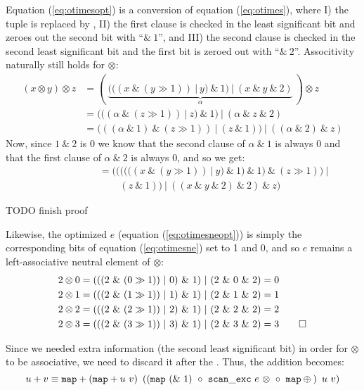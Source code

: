 Equation (\ref{eq:otimesopt}) is a conversion of equation (\ref{eq:otimes}), where I) the tuple is replaced by , II) the first clause is checked in the least significant bit and zeroes out the second bit with ``$\&~1$'', and III) the second clause is checked in the second least significant bit and the first bit is zeroed out with ``$\&~2$''. Associtivity naturally still holds for $\otimes$:
\begin{align}
  \label{eq:otimesproof}
  (x \otimes y) \otimes z &= (~\underbrace{(((x~\&~(y \gg 1))~|~y)~\&~1)~|~(x~\&~y~\&~2)}_{\alpha}~) \otimes z\\
              &= (((\alpha~\&~(z \gg 1))~|~z)~\&~1)~|~(\alpha~\&~z~\&~2)\\
              &= (((\alpha~\&~1)~\&~(z \gg 1))~|~(z~\&~1))~|~((\alpha~\&~2)~\&~z)
\end{align}
Now, since $1~\&~2$ is $0$ we know that the second clause of $\alpha~\&~1$ is always $0$ and that the first clause of $\alpha~\&~2$ is always $0$, and so we get: 
  \begin{align}
  \label{eq:otimesproof}
  \phantom{(x \otimes y) \otimes z}
    &= ((((((x~\&~(y \gg 1))~|~y)~\&~1)~\&~1)~\&~(z \gg 1))~|\\
    &\phantom{= ((}(z~\&~1))~|~((x~\&~y~\&~2)~\&~2)~\&~z)
  \end{align}
  
{\color{red} TODO finish proof}


Likewise, the optimized $e$ (equation (\ref{eq:otimesneopt})) is simply the corresponding bits of equation (\ref{eq:otimesne}) set to 1 and 0, and so $e$ remains a left-associative neutral element of $\otimes$:
\begin{align}
  \label{eq:otimesneproof}
  2 \otimes 0 &= (((2~\&~(0 \gg 1))~|~0)~\&~1)~|~(2~\&~0~\&~2) = 0 \\
  2 \otimes 1 &= (((2~\&~(1 \gg 1))~|~1)~\&~1)~|~(2~\&~1~\&~2) = 1 \\
  2 \otimes 2 &= (((2~\&~(2 \gg 1))~|~2)~\&~1)~|~(2~\&~2~\&~2) = 2 \\
  2 \otimes 3 &= (((2~\&~(3 \gg 1))~|~3)~\&~1)~|~(2~\&~3~\&~2) = 3 \qed
\end{align}

Since we needed extra information (the second least significant bit) in order for $\otimes$ to be associative, we need to discard it after the . Thus, the addition becomes:
\begin{equation}
\label{eq:addgpu1}
u + v \equiv \mathtt{map} + \left( \mathtt{map} + u~v\right)~\left(\left(\mathtt{map}~(\&~1) ~\circ ~{\mathtt{scan\_exc}~e~\otimes}~ \circ ~ \mathtt{map} \oplus \phantom{}\right)~u~v\right)
\end{equation}


